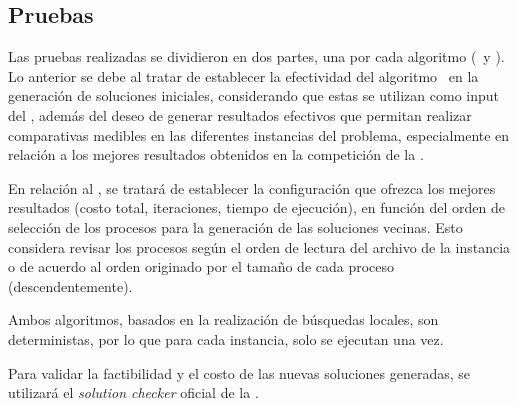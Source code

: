 \documentclass[../informe2.tex]{subfiles}
\begin{document}
\subsection{Pruebas}
\label{sub:Pruebas}
Las pruebas realizadas se dividieron en dos partes, una por cada algoritmo (\greedy\ y \hillc). Lo anterior se debe al tratar de establecer la efectividad del algoritmo \greedy\ en la generación de soluciones iniciales, considerando que estas se utilizan como input del \hillc, además del deseo de generar resultados efectivos que permitan realizar comparativas medibles en las diferentes instancias del problema, especialmente en relación a los mejores resultados obtenidos en la competición de la \roadef. \par
\noindent En relación al \hillc, se tratará de establecer la configuración que ofrezca los mejores resultados (costo total, iteraciones, tiempo de ejecución), en función del orden de selección de los procesos para la generación de las soluciones vecinas. Esto considera revisar los procesos según el orden de lectura del archivo de la instancia o de acuerdo al orden originado por el tamaño de cada proceso (descendentemente). \par
\noindent Ambos algoritmos, basados en la realización de búsquedas locales, son deterministas, por lo que para cada instancia, solo se ejecutan una vez. \par
\noindent Para validar la factibilidad y el costo de las nuevas soluciones generadas, se utilizará el \textit{solution checker} oficial de la \roadef.
\end{document}
